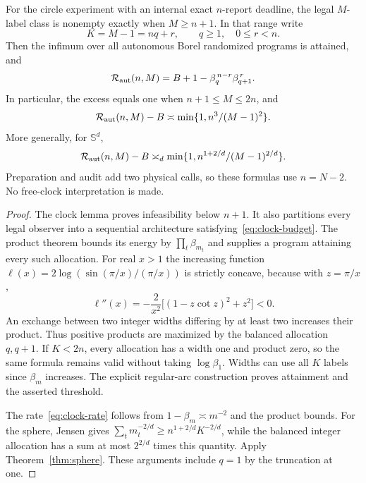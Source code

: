 \begin{theorem}\label{thm:clock-circle}
For the circle experiment with an internal exact $n$-report deadline, the legal $M$-label class is nonempty exactly when $M\ge n+1$. In that range write
\[
 K=M-1=nq+r,\qquad q\ge1,\quad 0\le r<n.
\]
Then the infimum over all autonomous Borel randomized programs is attained, and
\begin{equation}\label{eq:clock-circle}
 \mathcal R_{\rm aut}(n,M)=B+1-\beta_q^{\,n-r}\beta_{q+1}^{\,r}.
\end{equation}
In particular, the excess equals one when $n+1\le M\le2n$, and
\begin{equation}\label{eq:clock-rate}
 \mathcal R_{\rm aut}(n,M)-B
 \asymp \min\{1,n^3/(M-1)^2\}.
\end{equation}
More generally, for $\mathbb S^d$,
\begin{equation}\label{eq:clock-sphere}
 \mathcal R_{\rm aut}(n,M)-B
 \asymp_d\min\{1,n^{1+2/d}/(M-1)^{2/d}\}.
\end{equation}
Preparation and audit add two physical calls, so these formulas use $n=N-2$. No free-clock interpretation is made.
\end{theorem}
\begin{proof}
The clock lemma proves infeasibility below $n+1$. It also partitions every legal observer into a sequential architecture satisfying~\eqref{eq:clock-budget}. The product theorem bounds its energy by $\prod_t\beta_{m_t}$ and supplies a program attaining every such allocation. For real $x>1$ the increasing function
$\ell(x)=2\log(\sin(\pi/x)/(\pi/x))$
is strictly concave, because with $z=\pi/x$,
\[
 \ell''(x)=-\frac2{x^2}\bigl[(1-z\cot z)^2+z^2\bigr]<0.
\]
An exchange between two integer widths differing by at least two increases their product. Thus positive products are maximized by the balanced allocation $q,q+1$. If $K<2n$, every allocation has a width one and product zero, so the same formula remains valid without taking $\log\beta_1$. Widths can use all $K$ labels since $\beta_m$ increases. The explicit regular-arc construction proves attainment and the asserted threshold.

The rate~\eqref{eq:clock-rate} follows from $1-\beta_m\asymp m^{-2}$ and the product bounds. For the sphere, Jensen gives $\sum_t m_t^{-2/d}\ge n^{1+2/d}K^{-2/d}$, while the balanced integer allocation has a sum at most $2^{2/d}$ times this quantity. Apply Theorem~\ref{thm:sphere}. These arguments include $q=1$ by the truncation at one.
\end{proof}

